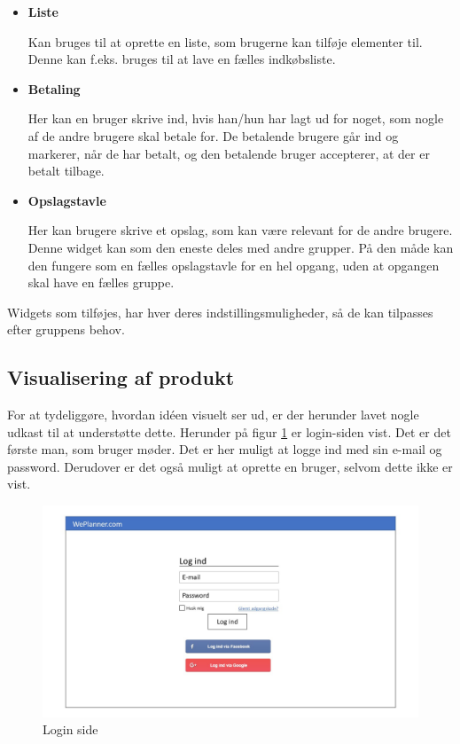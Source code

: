 \begin{itemize}
\item  \textbf{Liste}

\noindent Kan bruges til at oprette en liste, som brugerne kan tilføje elementer til. Denne kan f.eks. bruges til at lave en fælles indkøbsliste.
\end{itemize}

\begin{itemize}
\item  \textbf{Betaling}

\noindent Her kan en bruger skrive ind, hvis han/hun har lagt ud for noget, som nogle af de andre brugere skal betale for. De betalende brugere går ind og markerer, når de har betalt, og den betalende bruger accepterer, at der er betalt tilbage.
\end{itemize}

\begin{itemize}
\item  \textbf{Opslagstavle}

\noindent Her kan brugere skrive et opslag, som kan være relevant for de andre brugere. Denne widget kan som den eneste deles med andre grupper. På den måde kan den fungere som en fælles opslagstavle for en hel opgang, uden at opgangen skal have en fælles gruppe.
\end{itemize}

\noindent Widgets som tilføjes, har hver deres indstillingsmuligheder, så de kan tilpasses efter gruppens behov. 

\subsection{Visualisering af produkt}
For at tydeliggøre, hvordan idéen visuelt ser ud, er der herunder lavet nogle udkast til at understøtte dette. Herunder på figur \ref{fig:login_site} er login-siden vist. Det er det første man, som bruger møder. Det er her muligt at logge ind med sin e-mail og password. Derudover er det også muligt at oprette en bruger, selvom dette ikke er vist.
\begin{figure}[H]
  \includegraphics[width=\linewidth]{01_Billeder/04_Indledning/Slide1.JPG}
  \centering
  \caption{Login side}
  \label{fig:login_site}
\end{figure}

